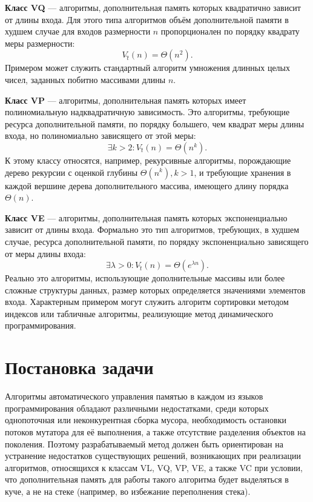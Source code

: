 \textbf{Класс VQ} --- алгоритмы, дополнительная память которых квадратично зависит от длины входа. Для этого типа алгоритмов объём дополнительной памяти в худшем случае для входов размерности $n$ пропорционален по порядку квадрату меры размерности:
\begin{equation}
	V\hat{_t}(n) = \Theta(n^2).
\end{equation}
Примером может служить стандартный алгоритм умножения длинных целых чисел, заданных побитно массивами длины $n$.~\cite{uljanov}

\textbf{Класс VP} --- алгоритмы, дополнительная память которых имеет полиномиальную надквадратичную зависимость. Это алгоритмы, требующие ресурса дополнительной памяти, по порядку большего, чем квадрат меры длины входа, но полиномиально зависящего от этой меры:
\begin{equation}
	\exists k > 2: V\hat{_t}(n) = \Theta(n^k).
\end{equation}	
К этому классу относятся, например, рекурсивные алгоритмы, порождающие дерево рекурсии с оценкой глубины $\Theta(n^k), k > 1$, и требующие хранения в каждой вершине дерева дополнительного массива, имеющего длину порядка $\Theta(n)$.~\cite{uljanov}

\textbf{Класс VE} --- алгоритмы, дополнительная память которых экспоненциально зависит от длины входа. Формально это тип алгоритмов, требующих, в худшем случае, ресурса дополнительной памяти, по порядку экспоненциально зависящего от меры длины входа:
\begin{equation}
	\exists \lambda > 0: V\hat{_t}(n) = \Theta(e^{\lambda n}).
\end{equation}
Реально это алгоритмы, использующие дополнительные массивы или более сложные структуры данных, размер которых определяется значениями элементов входа. Характерным примером могут служить алгоритм сортировки методом индексов или табличные алгоритмы, реализующие метод динамического программирования.~\cite{uljanov}


\section*{Постановка задачи}

Алгоритмы автоматического управления памятью в каждом из языков программирования обладают различными недостатками, среди которых однопоточная или неконкурентная сборка мусора, необходимость остановки потоков мутатора для её выполнения, а также отсутствие разделения объектов на поколения. Поэтому разрабатываемый метод должен быть ориентирован на устранение недостатков существующих решений, возникающих при реализации алгоритмов, относящихся к классам VL, VQ, VP, VE, а также VC при условии, что дополнительная память для работы такого алгоритма будет выделяться в куче, а не на стеке (например, во избежание переполнения стека).

